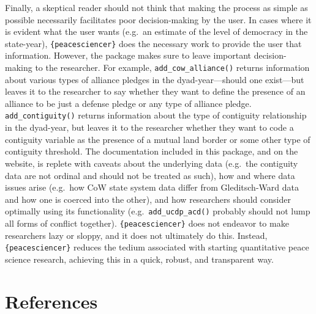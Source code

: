 \documentclass[
  11pt,
]{article}
\begin{document}
Finally, a skeptical reader should not think that making the process as simple as possible necessarily facilitates poor decision-making by the user. In cases where it is evident what the user wants (e.g.~an estimate of the level of democracy in the state-year), \texttt{\{peacesciencer\}} does the necessary work to provide the user that information. However, the package makes sure to leave important decision-making to the researcher. For example, \texttt{add\_cow\_alliance()} returns information about various types of alliance pledges in the dyad-year---should one exist---but leaves it to the researcher to say whether they want to define the presence of an alliance to be just a defense pledge or any type of alliance pledge. \texttt{add\_contiguity()} returns information about the type of contiguity relationship in the dyad-year, but leaves it to the researcher whether they want to code a contiguity variable as the presence of a mutual land border or some other type of contiguity threshold. The documentation included in this package, and on the website, is replete with caveats about the underlying data (e.g.~the contiguity data are not ordinal and should not be treated as such), how and where data issues arise (e.g.~how CoW state system data differ from Gleditsch-Ward data and how one is coerced into the other), and how researchers should consider optimally using its functionality (e.g.~\texttt{add\_ucdp\_acd()} probably should not lump all forms of conflict together). \texttt{\{peacesciencer\}} does not endeavor to make researchers lazy or sloppy, and it does not ultimately do this. Instead, \texttt{\{peacesciencer\}} reduces the tedium associated with starting quantitative peace science research, achieving this in a quick, robust, and transparent way.

\newpage

\hypertarget{references}{%
\section{References}\label{references}}

\setlength{\parskip}{6pt}
\end{document}
